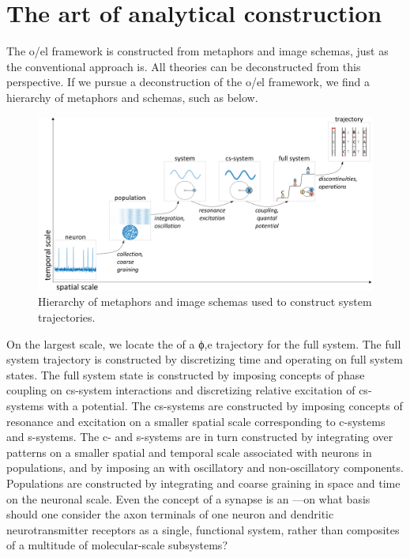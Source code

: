 \section{The art of analytical construction}

The o/el framework is constructed from metaphors and image schemas, just as the conventional approach is. All theories can be deconstructed from this perspective. If we pursue a deconstruction of the o/el framework, we find a hierarchy of metaphors and schemas, such as below. 

  
\begin{figure}
\includegraphics[width=\textwidth]{figures/Tilsen-img169.png}
\caption{Hierarchy of metaphors and image schemas used to construct system trajectories.}
\label{fig:8:3}
\end{figure}
 

  On the largest scale, we locate the  of a ϕ,e  trajectory for the full system. The full system trajectory is constructed by discretizing time and operating on full system states. The full system state is constructed by imposing concepts of phase coupling on cs-system interactions and discretizing relative excitation of cs-systems with a  potential. The cs-systems are constructed by imposing concepts of resonance and excitation on a smaller spatial scale corresponding to c-systems and s-systems. The c- and s-systems are in turn constructed by integrating over patterns on a smaller spatial and temporal scale associated with neurons in populations, and by imposing an  with oscillatory and non-oscillatory components. Populations are constructed by integrating and coarse graining in space and time on the neuronal scale. Even the concept of a synapse is an —on what basis should one consider the axon terminals of one neuron and dendritic neurotransmitter receptors as a single, functional system, rather than composites of a multitude of molecular-scale subsystems? 

